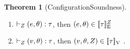 \documentclass[a4paper,11pt]{article}
\theoremstyle{definition}
\newtheorem{thm}{Theorem}
\begin{document}
\clearpage

\begin{thm}[ConfigurationSoundness]
  \label{sound}
  \begin{enumerate} 
   \item $ \vdash_{Z}  ( e, \theta) : \tau $, then $(
     e, \theta) \in  [\![  \tau ]\!]_{\text{E}}^{ Z} $
   \item $ \vdash_{Z} (v, \theta) : \tau  $, then $ (v,
     \theta, Z) \in [\![ \tau ]\!]_{\text{V}} $  .
  \end{enumerate}
\end{thm}



\end{document}
